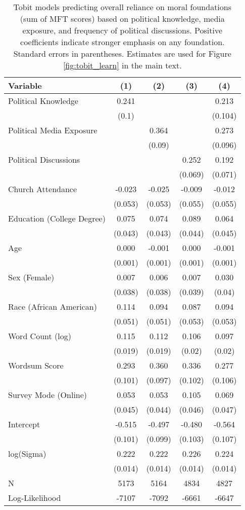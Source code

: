 \begin{table}[ht]
\centering
\caption{Tobit models predicting overall reliance on moral foundations
           (sum of MFT scores) based on political knowledge, media exposure, and frequency of 
           political discussions. Positive coefficients indicate stronger emphasis on any foundation.
           Standard errors in parentheses. Estimates are used for Figure \ref{fig:tobit_learn} in 
           the main text.} 
\label{tab:tobit_learn}
\begingroup\footnotesize
\begin{tabular}{lcccc}
  \hline
Variable & (1) & (2) & (3) & (4) \\ 
  \hline
Political Knowledge &  0.241 &  &  &  0.213 \\ 
   & (0.1) &  &  & (0.104) \\ 
  Political Media Exposure &  &  0.364 &  &  0.273 \\ 
   &  & (0.09) &  & (0.096) \\ 
  Political
Discussions &  &  &  0.252 &  0.192 \\ 
   &  &  & (0.069) & (0.071) \\ 
  Church Attendance & -0.023 & -0.025 & -0.009 & -0.012 \\ 
   & (0.053) & (0.053) & (0.055) & (0.055) \\ 
  Education (College Degree) &  0.075 &  0.074 &  0.089 &  0.064 \\ 
   & (0.043) & (0.043) & (0.044) & (0.045) \\ 
  Age &  0.000 & -0.001 &  0.000 & -0.001 \\ 
   & (0.001) & (0.001) & (0.001) & (0.001) \\ 
  Sex (Female) &  0.007 &  0.006 &  0.007 &  0.030 \\ 
   & (0.038) & (0.038) & (0.039) & (0.04) \\ 
  Race (African American) &  0.114 &  0.094 &  0.087 &  0.094 \\ 
   & (0.051) & (0.051) & (0.053) & (0.053) \\ 
  Word Count (log) &  0.115 &  0.112 &  0.106 &  0.097 \\ 
   & (0.019) & (0.019) & (0.02) & (0.02) \\ 
  Wordsum Score &  0.293 &  0.360 &  0.336 &  0.277 \\ 
   & (0.101) & (0.097) & (0.102) & (0.106) \\ 
  Survey Mode (Online) &  0.053 &  0.053 &  0.105 &  0.069 \\ 
   & (0.045) & (0.044) & (0.046) & (0.047) \\ 
  Intercept & -0.515 & -0.497 & -0.480 & -0.564 \\ 
   & (0.101) & (0.099) & (0.103) & (0.107) \\ 
  log(Sigma) &  0.222 &  0.222 &  0.226 &  0.224 \\ 
   & (0.014) & (0.014) & (0.014) & (0.014) \\ 
   \hline
N & 5173 & 5164 & 4834 & 4827 \\ 
  Log-Likelihood & -7107 & -7092 & -6661 & -6647 \\ 
   \hline
\end{tabular}
\endgroup
\end{table}
